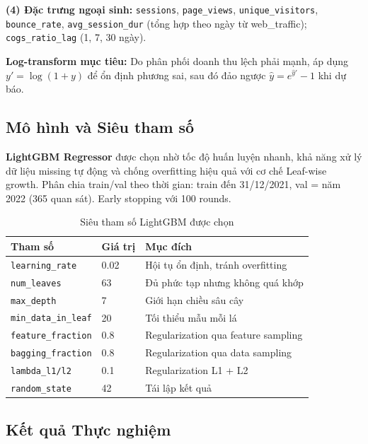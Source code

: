 \documentclass{article}
\begin{document}
\textbf{(4) Đặc trưng ngoại sinh:} \texttt{sessions}, \texttt{page\_views}, \texttt{unique\_visitors}, \texttt{bounce\_rate}, \texttt{avg\_session\_dur} (tổng hợp theo ngày từ web\_traffic); \texttt{cogs\_ratio\_lag} (1, 7, 30 ngày).

\textbf{Log-transform mục tiêu:} Do phân phối doanh thu lệch phải mạnh, áp dụng $y' = \log(1 + y)$ để ổn định phương sai, sau đó đảo ngược $\hat{y} = e^{\hat{y}'} - 1$ khi dự báo.

\subsection{Mô hình và Siêu tham số}

\textbf{LightGBM Regressor} được chọn nhờ tốc độ huấn luyện nhanh, khả năng xử lý dữ liệu missing tự động và chống overfitting hiệu quả với cơ chế Leaf-wise growth. Phân chia train/val theo thời gian: train đến 31/12/2021, val = năm 2022 (365 quan sát). Early stopping với 100 rounds.

\begin{table}[h]
  \caption{Siêu tham số LightGBM được chọn}
  \label{tab:params}
  \centering\small
  \begin{tabular}{lll}
    \toprule
    \textbf{Tham số} & \textbf{Giá trị} & \textbf{Mục đích} \\
    \midrule
    \texttt{learning\_rate}     & 0.02  & Hội tụ ổn định, tránh overfitting \\
    \texttt{num\_leaves}        & 63    & Đủ phức tạp nhưng không quá khớp \\
    \texttt{max\_depth}         & 7     & Giới hạn chiều sâu cây \\
    \texttt{min\_data\_in\_leaf}& 20    & Tối thiểu mẫu mỗi lá \\
    \texttt{feature\_fraction}  & 0.8   & Regularization qua feature sampling \\
    \texttt{bagging\_fraction}  & 0.8   & Regularization qua data sampling \\
    \texttt{lambda\_l1/l2}      & 0.1   & Regularization L1 + L2 \\
    \texttt{random\_state}      & 42    & Tái lập kết quả \\
    \bottomrule
  \end{tabular}
\end{table}

\subsection{Kết quả Thực nghiệm}
\end{document}
